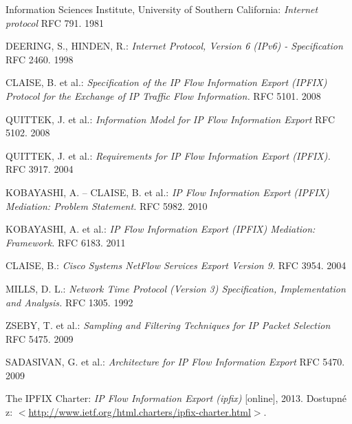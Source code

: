 \begin{thebibliography}{999}


Information Sciences Institute, University of Southern California: \emph{Internet protocol} 
RFC 791. 1981

DEERING, S., HINDEN, R.: \emph{Internet Protocol, Version 6 (IPv6) - Specification} 
RFC 2460. 1998

CLAISE, B. et al.: \emph{Specification of the IP Flow Information Export 
(IPFIX) Protocol for the Exchange of IP Traffic Flow Information.} 
RFC 5101. 2008

QUITTEK, J. et al.: \emph{Information Model for IP Flow Information Export} 
RFC 5102. 2008

QUITTEK, J. et al.: \emph{Requirements for IP Flow Information Export (IPFIX).} 
RFC 3917. 2004

KOBAYASHI, A. -- CLAISE, B. et al.: \emph{IP Flow Information Export (IPFIX) Mediation: Problem Statement.} 
RFC 5982. 2010

KOBAYASHI, A. et al.: \emph{IP Flow Information Export (IPFIX) Mediation: Framework.} 
RFC 6183. 2011

CLAISE, B.: \emph{Cisco Systems NetFlow Services Export Version 9.} 
RFC 3954. 2004

MILLS, D. L.: \emph{Network Time Protocol (Version 3) Specification, Implementation and Analysis.} 
RFC 1305. 1992

ZSEBY, T. et al.: \emph{Sampling and Filtering Techniques for IP Packet Selection} 
RFC 5475. 2009

SADASIVAN, G. et al.: \emph{Architecture for IP Flow Information Export} 
RFC 5470. 2009


The IPFIX Charter: \emph{IP Flow Information Export (ipfix)} [online], 2013. Dostupné 
z: $<$\url{http://www.ietf.org/html.charters/ipfix-charter.html}$>$.


\end{thebibliography}
